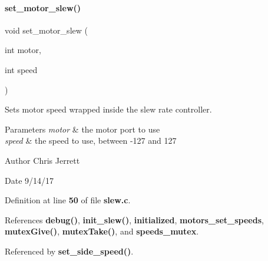 \paragraph{set\+\_\+motor\+\_\+slew()}
{\footnotesize\ttfamily void set\+\_\+motor\+\_\+slew (\begin{DoxyParamCaption}\item[{int}]{motor,  }\item[{int}]{speed }\end{DoxyParamCaption})}



Sets motor speed wrapped inside the slew rate controller. 


\begin{DoxyParams}{Parameters}
{\em motor} & the motor port to use \\
\hline
{\em speed} & the speed to use, between -\/127 and 127 \\
\hline
\end{DoxyParams}
\begin{DoxyAuthor}{Author}
Chris Jerrett 
\end{DoxyAuthor}
\begin{DoxyDate}{Date}
9/14/17 
\end{DoxyDate}


Definition at line \textbf{ 50} of file \textbf{ slew.\+c}.



References \textbf{ debug()}, \textbf{ init\+\_\+slew()}, \textbf{ initialized}, \textbf{ motors\+\_\+set\+\_\+speeds}, \textbf{ mutex\+Give()}, \textbf{ mutex\+Take()}, and \textbf{ speeds\+\_\+mutex}.



Referenced by \textbf{ set\+\_\+side\+\_\+speed()}.


